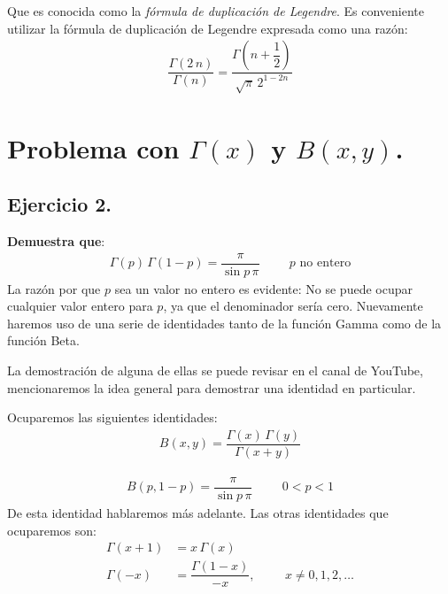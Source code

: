 Que es conocida como la \emph{fórmula de duplicación de Legendre}. Es conveniente utilizar la fórmula de duplicación de Legendre expresada como una razón:
\begin{align*}
\dfrac{\Gamma(2 \, n)}{\Gamma (n)} = \dfrac{\Gamma \left( n + \dfrac{1}{2} \right)}{\sqrt{\pi} \, 2^{1- 2n}}
\end{align*}


\section{Problema con \texorpdfstring{$\Gamma(x)$}{G(x)} y \texorpdfstring{$B(x, y)$}{B(x,y)}.}
\subsection{Ejercicio 2.}


\textbf{Demuestra que}: 
\begin{align*}
\Gamma(p) \, \Gamma(1 - p) = \dfrac{\pi}{\sin p \, \pi} \hspace{1cm} p \mbox{ no entero}
\end{align*}
La razón por que $p$ sea un valor no entero es evidente: No se puede ocupar cualquier valor entero para $p$, ya que el denominador sería cero. Nuevamente haremos uso de una serie de identidades tanto de la función Gamma como de la función Beta.
\par
La demostración de alguna de ellas se puede revisar en el canal de YouTube, mencionaremos la idea general para demostrar una identidad en particular.
\par
Ocuparemos las siguientes identidades:
\begin{align}
B(x, y) = \dfrac{\Gamma(x) \, \Gamma(y)}{\Gamma(x + y)}
\label{eq:ecuacion_01}
\end{align}

\begin{align}
B(p, 1 - p) = \dfrac{\pi}{\sin p \, \pi} \hspace{1cm} 0 < p < 1
\label{eq:ecuacion_02}
\end{align}
De esta identidad hablaremos más adelante. Las otras identidades que ocuparemos son:
\begin{align}
\Gamma(x + 1) &= x \, \Gamma(x) \label{eq:ecuacion_03} \\[0.5em]
\Gamma(-x) &= \dfrac{\Gamma(1 - x)}{-x}, \hspace{1cm} x \neq 0, 1, 2, \ldots \label{eq:ecuacion_04}
\end{align}

